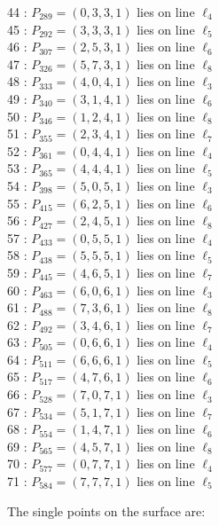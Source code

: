 \documentclass{article}
\begin{document}
{\begin{multicols}{2}
44 : $P_{289}=( 0, 3, 3, 1 )$ lies on line $\ell_{4}$\\
45 : $P_{292}=( 3, 3, 3, 1 )$ lies on line $\ell_{5}$\\
46 : $P_{307}=( 2, 5, 3, 1 )$ lies on line $\ell_{6}$\\
47 : $P_{326}=( 5, 7, 3, 1 )$ lies on line $\ell_{8}$\\
48 : $P_{333}=( 4, 0, 4, 1 )$ lies on line $\ell_{3}$\\
49 : $P_{340}=( 3, 1, 4, 1 )$ lies on line $\ell_{6}$\\
50 : $P_{346}=( 1, 2, 4, 1 )$ lies on line $\ell_{8}$\\
51 : $P_{355}=( 2, 3, 4, 1 )$ lies on line $\ell_{7}$\\
52 : $P_{361}=( 0, 4, 4, 1 )$ lies on line $\ell_{4}$\\
53 : $P_{365}=( 4, 4, 4, 1 )$ lies on line $\ell_{5}$\\
54 : $P_{398}=( 5, 0, 5, 1 )$ lies on line $\ell_{3}$\\
55 : $P_{415}=( 6, 2, 5, 1 )$ lies on line $\ell_{6}$\\
56 : $P_{427}=( 2, 4, 5, 1 )$ lies on line $\ell_{8}$\\
57 : $P_{433}=( 0, 5, 5, 1 )$ lies on line $\ell_{4}$\\
58 : $P_{438}=( 5, 5, 5, 1 )$ lies on line $\ell_{5}$\\
59 : $P_{445}=( 4, 6, 5, 1 )$ lies on line $\ell_{7}$\\
60 : $P_{463}=( 6, 0, 6, 1 )$ lies on line $\ell_{3}$\\
61 : $P_{488}=( 7, 3, 6, 1 )$ lies on line $\ell_{8}$\\
62 : $P_{492}=( 3, 4, 6, 1 )$ lies on line $\ell_{7}$\\
63 : $P_{505}=( 0, 6, 6, 1 )$ lies on line $\ell_{4}$\\
64 : $P_{511}=( 6, 6, 6, 1 )$ lies on line $\ell_{5}$\\
65 : $P_{517}=( 4, 7, 6, 1 )$ lies on line $\ell_{6}$\\
66 : $P_{528}=( 7, 0, 7, 1 )$ lies on line $\ell_{3}$\\
67 : $P_{534}=( 5, 1, 7, 1 )$ lies on line $\ell_{7}$\\
68 : $P_{554}=( 1, 4, 7, 1 )$ lies on line $\ell_{6}$\\
69 : $P_{565}=( 4, 5, 7, 1 )$ lies on line $\ell_{8}$\\
70 : $P_{577}=( 0, 7, 7, 1 )$ lies on line $\ell_{4}$\\
71 : $P_{584}=( 7, 7, 7, 1 )$ lies on line $\ell_{5}$\\
\end{multicols}
The single points on the surface are:\\
}
\end{document}
